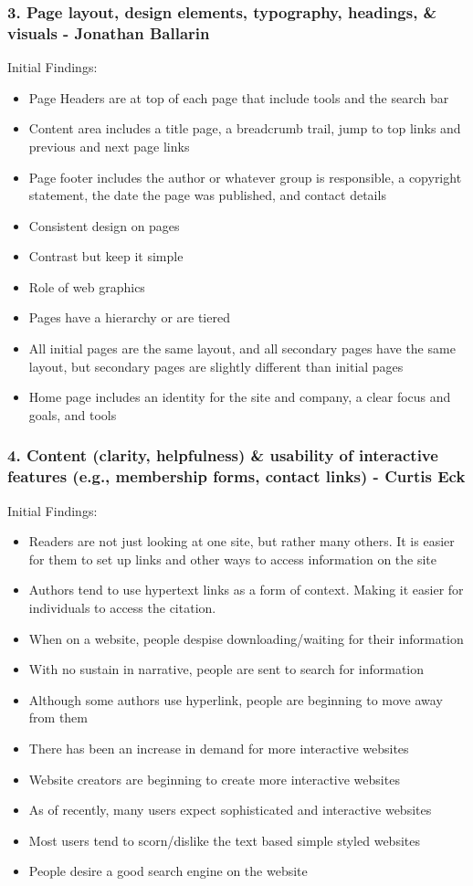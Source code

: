 \documentclass[12pt]{article}
\begin{document}
\subsubsection*{3. Page layout, design elements, typography, headings, \& visuals - Jonathan Ballarin}
Initial Findings:
\begin{itemize}
\item Page Headers are at top of each page that include tools and the search bar
\item Content area includes a title page, a breadcrumb trail, jump to top links and previous and next page links
\item Page footer includes the author or whatever group is responsible, a copyright statement, the date the page was published, and contact details
\item Consistent design on pages
\item Contrast but keep it simple
\item Role of web graphics
\item Pages have a hierarchy or are tiered
\item All initial pages are the same layout, and all secondary pages have the same layout, but secondary pages are slightly different than initial pages
\item Home page includes an identity for the site and company, a clear focus and goals, and tools
\end{itemize}

\subsubsection*{4. Content (clarity, helpfulness) \& usability of interactive features (e.g., membership forms, contact links) - Curtis Eck}
Initial Findings:
\begin{itemize}
\item Readers are not just looking at one site, but rather many others. It is easier for them to set up links and other ways to access information on the site
\item Authors tend to use hypertext links as a form of context. Making it easier for individuals to access the citation.
\item When on a website, people despise downloading/waiting for their information
\item With no sustain in narrative, people are sent to search for information
\item Although some authors use hyperlink, people are beginning to move away from them
\item There has been an increase in demand for more interactive websites
\item Website creators are beginning to create more interactive websites
\item As of recently, many users expect sophisticated and interactive websites
\item Most users tend to scorn/dislike the text based simple styled websites
\item People desire a good search engine on the website
\end{itemize}
\end{document}
